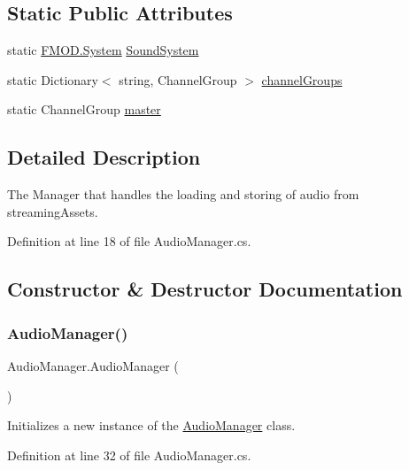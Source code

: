 \subsection*{Static Public Attributes}
\begin{DoxyCompactItemize}
\item 
static \hyperlink{_simple_priority_queue_8cs_a81a223a02c34d82b47199f08308847f2}{F\+M\+O\+D.\+System} \hyperlink{class_audio_manager_ad814b36aaed870a96339bcc8fb97e742}{Sound\+System}
\item 
static Dictionary$<$ string, Channel\+Group $>$ \hyperlink{class_audio_manager_a244e34ddca536d06f27f229d9bf5a892}{channel\+Groups}
\item 
static Channel\+Group \hyperlink{class_audio_manager_ad10f0724af4436d127f862f949b6f613}{master}
\end{DoxyCompactItemize}


\subsection{Detailed Description}
The Manager that handles the loading and storing of audio from streaming\+Assets. 



Definition at line 18 of file Audio\+Manager.\+cs.



\subsection{Constructor \& Destructor Documentation}
\mbox{\label{class_audio_manager_a3b15a1c66b05db34662afc48280e46cd}} 
\subsubsection{\texorpdfstring{Audio\+Manager()}{AudioManager()}}
{\footnotesize\ttfamily Audio\+Manager.\+Audio\+Manager (\begin{DoxyParamCaption}{ }\end{DoxyParamCaption})}



Initializes a new instance of the \hyperlink{class_audio_manager}{Audio\+Manager} class. 



Definition at line 32 of file Audio\+Manager.\+cs.



